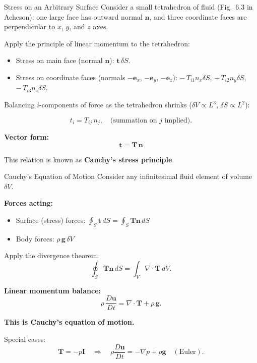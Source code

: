 \documentclass[aspectratio=169]{beamer}
\begin{document}
\begin{frame}{Stress on an Arbitrary Surface}
\footnotesize
Consider a small tetrahedron of fluid (Fig.~6.3 in Acheson):
one large face has outward normal $\bm{n}$,
and three coordinate faces are perpendicular to $x$, $y$, and $z$ axes.

\vspace{0.3cm}

Apply the principle of linear momentum to the tetrahedron:

\begin{itemize}
  \item Stress on main face (normal $\bm{n}$): $\bm{t}\,\delta S$.
  \item Stress on coordinate faces (normals $-\bm{e}_x$, $-\bm{e}_y$, $-\bm{e}_z$): 
  $-\,T_{i1}n_x\delta S$, $-\,T_{i2}n_y\delta S$, $-\,T_{i3}n_z\delta S$.
\end{itemize}

Balancing $i$-components of force as the tetrahedron shrinks ($\delta V\propto L^3$, $\delta S\propto L^2$):

\[
t_i = T_{ij}\,n_j,
\quad \text{(summation on $j$ implied).}
\]

\vspace{0.4cm}

\textbf{Vector form:}
\[
\boxed{\;\bm{t} = \bm{T}\,\bm{n}\;}
\]

This relation is known as \textbf{Cauchy’s stress principle}.

\end{frame}
\begin{frame}{Cauchy’s Equation of Motion}
\small
Consider any infinitesimal fluid element of volume $\delta V$.

\textbf{Forces acting:}
\begin{itemize}
  \item Surface (stress) forces: $\displaystyle \oint_S \bm{t}\,dS = \oint_S \bm{T}\bm{n}\,dS$
  \item Body forces: $\rho\,\bm{g}\,\delta V$
\end{itemize}

\vspace{0.3cm}

Apply the divergence theorem:
\[
\oint_S \bm{T}\bm{n}\,dS = \int_V \nabla\cdot\bm{T}\,dV.
\]

\textbf{Linear momentum balance:}
\[
\rho\,\frac{D\bm{u}}{Dt} = \nabla\cdot\bm{T} + \rho\,\bm{g}.
\]

\vspace{0.4cm}

\textbf{This is Cauchy’s equation of motion.}

\vspace{0.2cm}

Special cases:
\[
\bm{T} = -p\mathbf{I} \quad \Rightarrow \quad
\rho\frac{D\bm{u}}{Dt} = -\nabla p + \rho\bm{g} \quad (\text{Euler}).
\]

\end{frame}
\end{document}
